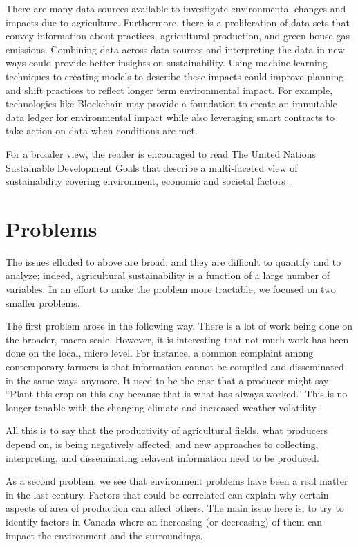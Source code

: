 \documentclass[11pt]{article}
\numberwithin{equation}{section}
\begin{document}
There are many data sources available to investigate environmental changes and impacts due to agriculture. Furthermore, there is a proliferation of data sets that convey information about practices, agricultural production, and green house gas emissions. Combining data across data sources and interpreting the data in new ways could provide better insights on sustainability. Using machine learning techniques to creating models to describe these impacts could improve planning and shift practices to reflect longer term environmental impact. For example, technologies like Blockchain may provide a foundation to create an immutable data ledger for environmental impact while also leveraging smart contracts to take action on data when conditions are met.

For a broader view, the reader is encouraged to read The United Nations Sustainable Development Goals that describe a multi-faceted view of sustainability covering environment, economic and societal factors \cite{UN-edgar}.


\section{Problems}\label{problems}

The issues elluded to above are broad, and they are difficult to quantify and to analyze; indeed, agricultural sustainability is a function of a large number of variables. In an effort to make the problem more tractable, we focused on two smaller problems.

The first problem arose in the following way. There is a lot of work being done on the broader, macro scale. However, it is interesting that not much work has been done on the local, micro level. For instance, a common complaint among contemporary farmers is that information cannot be compiled and disseminated in the same ways anymore. It used to be the case that a producer might say ``Plant this crop on this day because that is what has always worked.'' This is no longer tenable with the changing climate and increased weather volatility.

All this is to say that the productivity of agricultural fields, what producers depend on, is being negatively affected, and new approaches to collecting, interpreting, and disseminating relavent information need to be produced.

As a second problem, we see that environment problems  have been a real matter in the last century. Factors that could be correlated can explain why certain aspects of area of production can affect others. The main issue here is,  to try to identify  factors in  Canada where an increasing (or decreasing) of them can  impact the environment and the surroundings. 
\end{document}
